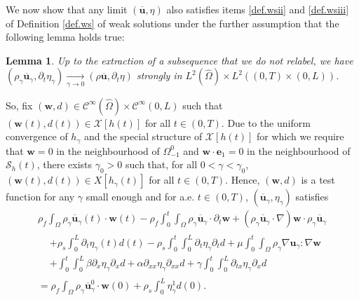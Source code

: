 \documentclass[10pt]{amsart}
\let\mathcal\mathscr
\newtheorem{lemma}[theorem]{Lemma}
\theoremstyle{remark}
\theoremstyle{definition}
\newcommand{\ug}{\boldsymbol{u}}
\newcommand{\wg}{\boldsymbol{w}}
\newcommand{\BS}[1]{\boldsymbol{#1}}
\let\CM\Omega
\newcommand{\CMT}{\widehat{\Omega}}
\begin{document}
We now show that any limit $(\overline{\ug},\eta)$ also satisfies items \eqref{def.wsii} and \eqref{def.wsiii} of Definition \ref{def.ws} of weak solutions under the further assumption that the following lemma holds true:

\begin{lemma}\label{lemma.convergence.L2} Up to the extraction of a subsequence that we do not relabel, we have $(\rho_\gamma\overline{\ug}_{\gamma},\partial_{t}\eta_{\gamma})\underset{\gamma\to 0}{\to}(\rho\overline{\ug},\partial_{t}\eta)$ strongly in $L^{2}(\CMT)\times L^{2}((0, T)\times (0,L))$.
\end{lemma}

So, fix $(\wg, d)\in\mathcal{C}^{\infty}(\CMT)\times \mathcal{C}^{\infty}(0, L) $ such that $(\wg(t), d(t))\in\mathcal{X}[h(t)]$ for all $t\in(0,T)$.
Due to the uniform convergence of $h_\gamma$ and the special structure of $\mathcal{X}[h(t)]$ for which we require that $\wg=0$ in the neighbourhood of $\Omega^0_{-1}$ and $\wg\cdot\BS{e}_{1}=0$ in the neighbourhood of $\mathcal{S}_h(t)$, there exists $\gamma_{0}>0$ such that, for all $0<\gamma<\gamma_{0}$, $(\wg(t),d(t))\in X[h_{\gamma}(t)]$ for all $t\in(0,T)$. Hence, $(\wg,d)$ is a test function for any $\gamma$ small enough and for a.e. $t\in(0,T)$, $(\overline{\ug}_{\gamma},\eta_{\gamma})$ satisfies
\begin{multline}\label{weak.formulation.FS.gamma.limit}
\rho_{f}\int_{\CM}\rho_{\gamma}\overline{\ug}_{\gamma}(t)\cdot\wg(t) -\rho_{f}\int_{0}^{t}\int_{\CM}\rho_{\gamma}\overline{\ug}_{\gamma}\cdot\partial_{t}\wg + (\rho_{\gamma}\overline{\ug}_{\gamma}\cdot\nabla)\wg\cdot\rho_{\gamma}\overline{\ug}_{\gamma}\\
\begin{aligned}
&+\rho_{s}\int_{0}^{L}\partial_{t}\eta_{\gamma}(t)d(t)-\rho_{s}\int_{0}^{t}\int_{0}^{L}\partial_{t}\eta_{\gamma}\partial_{t}d+\mu\int_{0}^{t}\int_{\CM}\rho_{\gamma} \nabla\ug_{\gamma}:\nabla\wg\\
&+\int_{0}^{t}\int_{0}^{L}\beta\partial_{x}\eta_{\gamma}\partial_{x}d + \alpha\partial_{xx}\eta_{\gamma}\partial_{xx}d+\gamma\int_{0}^{t}\int_{0}^{L}\partial_{tx}\eta_{\gamma}\partial_{x}d
\end{aligned}
\\
=\rho_{f}\int_{\CM}\rho_{\gamma}\overline{\ug}^{0}_{\gamma}\cdot\wg(0)+\rho_{s}\int_{0}^{L}\eta^{1}_{\gamma}d(0).
\end{multline}
\end{document}
